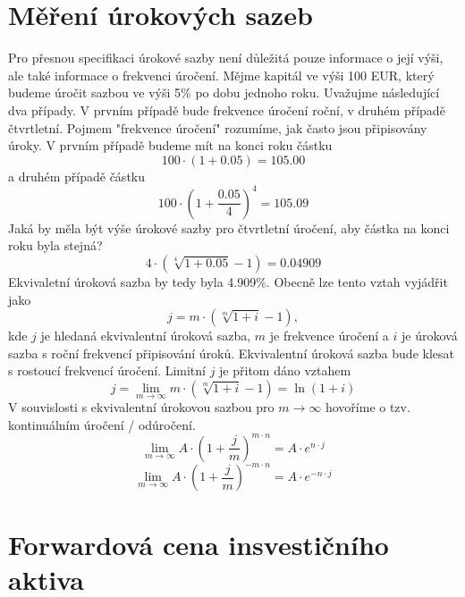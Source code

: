 \documentclass[a4paper]{book}
\begin{document}
\section{Měření úrokových sazeb}

Pro přesnou specifikaci úrokové sazby není důležitá pouze informace o její výši, ale také informace o frekvenci úročení.
Mějme kapitál ve výši 100 EUR, který budeme úročit sazbou ve výši 5\% po dobu jednoho roku. Uvažujme následující dva případy. V prvním případě bude frekvence úročení roční, v druhém případě čtvrtletní. Pojmem "frekvence úročení" rozumíme, jak často jsou připisovány úroky.
V prvním případě budeme mít na konci roku částku
\begin{equation*}
100 \cdot (1 + 0.05) = 105.00
\end{equation*}
a druhém případě částku
\begin{equation*}
100 \cdot \left( 1+\frac{0.05}{4} \right)^4 = 105.09
\end{equation*}
Jaká by měla být výše úrokové sazby pro čtvrtletní úročení, aby částka na konci roku byla stejná?
\begin{equation*}
4 \cdot \left( \sqrt[4]{1+0.05} - 1 \right) = 0.04909
\end{equation*}
Ekvivaletní úroková sazba by tedy byla 4.909\%. Obecně lze tento vztah vyjádřit jako
\begin{equation*}
j = m \cdot \left( \sqrt[m]{1+i} - 1 \right),
\end{equation*}
kde $j$ je hledaná ekvivalentní úroková sazba, $m$ je frekvence úročení a $i$ je úroková sazba s roční frekvencí připisování úroků.
Ekvivalentní úroková sazba bude klesat s rostoucí frekvencí úročení. Limitní $j$ je přitom dáno vztahem
\begin{equation*}
j = \lim_{m \to \infty} m \cdot \left( \sqrt[m]{1+i} - 1 \right) = \ln(1+i)
\end{equation*}
V souvislosti s ekvivalentní úrokovou sazbou pro $m \to \infty$ hovoříme o tzv. kontinuálním úročení / odúročení.
\begin{equation*}
\lim_{m \to \infty} A \cdot \left( 1 + \frac{j}{m} \right)^{m \cdot n} = A \cdot e^{n \cdot j}
\end{equation*}
\begin{equation*}
\lim_{m \to \infty} A \cdot \left( 1 + \frac{j}{m} \right)^{- m \cdot n} = A \cdot e^{-n \cdot j}
\end{equation*}

\section{Forwardová cena insvestičního aktiva}
\end{document}
